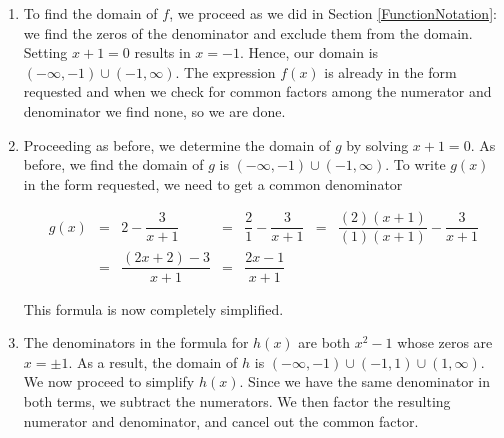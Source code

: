 {
\begin{enumerate}

\item To find the domain of $f$, we proceed as we did in Section \ref{FunctionNotation}: we find the zeros of the denominator and exclude them from the domain.  Setting $x+1=0$ results in  $x=-1$. Hence, our domain is  $(-\infty, -1) \cup (-1,\infty)$.  The expression $f(x)$ is already in the form requested and when we check for common factors among the numerator and denominator we find none, so we are done.

\item  Proceeding as before, we determine the domain of $g$ by solving $x+1=0$.  As before, we find the domain of $g$ is $(-\infty, -1) \cup (-1,\infty)$.  To write $g(x)$ in the form requested, we need to get a common denominator 

\[ \begin{array}{rclclcl}
g(x) & = & 2 - \dfrac{3}{x+1} & = & \dfrac{2}{1} - \dfrac{3}{x+1} & = & \dfrac{(2)(x+1)}{(1)(x+1)} - \dfrac{3}{x+1} \\ [.15in]
     & = & \dfrac{(2x+2) - 3}{x+1} & = & \dfrac{2x-1}{x+1} & & 
\end{array} \]

This formula is now completely simplified.


\item  The denominators in the formula for $h(x)$ are both $x^2-1$ whose zeros are  $x = \pm 1$.  As a result, the domain of $h$ is $(-\infty, -1) \cup (-1,1) \cup (1, \infty)$.  We now proceed to simplify $h(x)$.  Since we have the same denominator in both terms, we subtract the numerators.  We then factor the resulting numerator and denominator, and cancel out the common factor.


\end{enumerate}}
